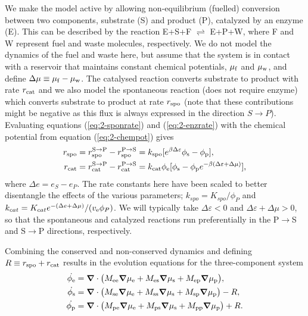We make the model active by allowing non-equilibrium (fuelled) conversion between two components, substrate (S) and product (P), catalyzed by an enzyme (E). This can be described by the reaction E+S+F $\rightleftharpoons$ E+P+W, where F and W represent fuel and waste molecules, respectively. We do not model the dynamics of the fuel and waste here, but assume that the system is in contact with a reservoir that maintains constant chemical potentials, $\mu_{\mathrm{f}}$ and $\mu_{\mathrm{w}}$, and define $\Delta\mu \equiv \mu_{\mathrm{f}}-\mu_{\mathrm{w}}$. The catalysed reaction converts substrate to product with rate $r_{\mathrm{cat}}$ and we also model the spontaneous reaction (does not require enzyme) which converts substrate to product at rate $r_{\mathrm{spo}}$ (note that these contributions might be negative as this flux is always expressed in the direction $S \rightarrow P$). Evaluating equations (\ref{eq:2-sponrate}) and (\ref{eq:2-enzrate}) with the chemical potential from equation (\ref{eq:2-chempot}) gives
\begin{align}
    r_{\mathrm{spo}} &= r_{\mathrm{spo}}^{\mathrm{S}\to\mathrm{P}} - r_{\mathrm{spo}}^{\mathrm{P}\to\mathrm{S}} = k_{\mathrm{spo}}[e^{\beta \Delta \varepsilon}\phi_{\mathrm{s}} - \phi_{\mathrm{p}}],
    \label{eq:2-r_spo} \\
    r_{\mathrm{cat}} &= r_{\mathrm{cat}}^{\mathrm{S}\to\mathrm{P}} - r_{\mathrm{cat}}^{\mathrm{P}\to\mathrm{S}} = k_{\mathrm{cat}}\phi_{\mathrm{e}}[\phi_{\mathrm{s}}-\phi_{\mathrm{p}} e^{-\beta(\Delta \varepsilon+ \Delta\mu)}],
    \label{eq:2-r_cat}
\end{align}
where $\Delta e = e_S - e_P$. The rate constants here have been scaled to better disentangle the effects of the various parameters; $k_{spo} = K_{spo}/\phi_P$ and $k_{cat} = K_{cat}e^{-(\Delta e + \Delta \mu)}/(v_{\mathrm{e}} \phi_P)$. We will typically take $\Delta \varepsilon<0$ and $\Delta \varepsilon + \Delta \mu>0$, so that the spontaneous and catalyzed reactions run preferentially in the P$\to$S and S$\to$P directions, respectively.

Combining the conserved and non-conserved dynamics and defining $R\equiv r_{\mathrm{spo}}+r_{\mathrm{cat}}$ results in the evolution equations for the three-component system
\begin{align}
    \dot{\phi_{\mathrm{e}}} &= \bm{\nabla} \cdot \big(M_{\mathrm{ee}}\bm{\nabla}\mu_{\mathrm{e}} + M_{\mathrm{es}}\bm{\nabla}\mu_{\mathrm{s}} + M_{\mathrm{ep}}\bm{\nabla}\mu_{\mathrm{p}}\big), \label{eq:2-evoE}\\
    \dot{\phi_{\mathrm{s}}} &= \bm{\nabla} \cdot \big(M_{\mathrm{se}}\bm{\nabla}\mu_{\mathrm{e}} + M_{\mathrm{ss}}\bm{\nabla}\mu_{\mathrm{s}} + M_{\mathrm{sp}}\bm{\nabla}\mu_{\mathrm{p}}\big) - R, \label{eq:2-evoS}\\
    \dot{\phi_{\mathrm{p}}} &= \bm{\nabla} \cdot \big(M_{\mathrm{pe}}\bm{\nabla}\mu_{\mathrm{e}} + M_{\mathrm{ps}}\bm{\nabla}\mu_{\mathrm{s}} + M_{\mathrm{pp}}\bm{\nabla}\mu_{\mathrm{p}}\big) + R. \label{eq:2-evoP}
\end{align}

